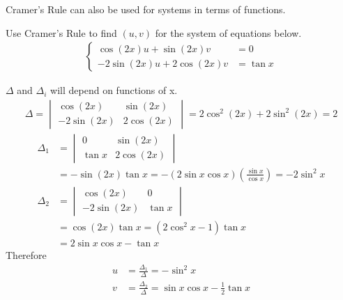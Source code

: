 Cramer's Rule can also be used for systems in terms of functions.
\begin{exmp}
Use Cramer's Rule to find $(u,v)$ for the system of equations below.
\begin{align}
\left\{\begin{alignedat}{1}
\cos(2x)u + \sin(2x)v &= 0 \\
-2\sin(2x)u + 2\cos(2x)v &= \tan x 
\end{alignedat}\right.
\end{align}
\end{exmp}
\begin{solution}
$\Delta$ and $\Delta_i$ will depend on functions of x.
\begin{align*}
\Delta = 
\begin{vmatrix}
\cos(2x) & \sin(2x) \\ 
-2\sin(2x) & 2\cos(2x)
\end{vmatrix}
= 2\cos^2(2x) + 2\sin^2(2x) = 2
\end{align*}
\begin{align*}
\Delta_1 &= 
\begin{vmatrix}
0 & \sin(2x) \\ 
\tan x & 2\cos(2x)
\end{vmatrix} \\
& = -\sin(2x)\tan x = -(2\sin x\cos x)(\frac{\sin x}{\cos x}) = -2\sin^2 x \\
\Delta_2 &= 
\begin{vmatrix}
\cos(2x) & 0 \\ 
-2\sin(2x) & \tan x
\end{vmatrix} \\
&= \cos(2x)\tan x = (2\cos^2 x - 1)\tan x \\
&= 2\sin x \cos x - \tan x 
\end{align*}
Therefore
\begin{align*}
u &= \frac{\Delta_1}{\Delta} = -\sin^2 x \\
v &= \frac{\Delta_2}{\Delta} = \sin x \cos x - \frac{1}{2}\tan x \\
\end{align*}
\end{solution}

